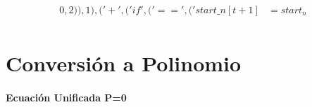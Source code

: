 \documentclass[10pt, a4paper]{article}
\begin{document}
\begin{align*}
0, 2)), 1), ('+', ('if', ('==', ('%
start\_n[t+1] &= start_n \\
\end{align*}\part{Conversión a Polinomio}
\subsection*{Ecuación Unificada P=0}
\end{document}
